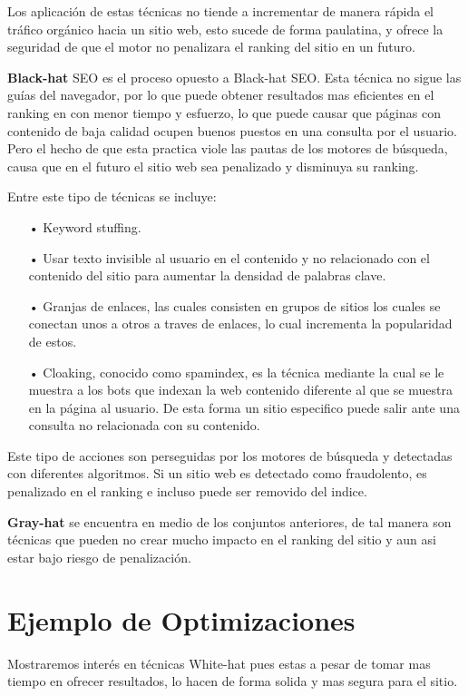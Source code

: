 \documentclass[12pt]{llncs}
\begin{document}
Los aplicación de estas técnicas no tiende a incrementar de manera rápida el tráfico orgánico hacia un sitio web, esto sucede de forma paulatina, y ofrece la seguridad de que el motor no penalizara el ranking del sitio en un futuro.

\textbf{Black-hat} SEO es el proceso opuesto a Black-hat SEO. Esta técnica no sigue las guías del navegador, por lo que puede obtener resultados mas eficientes en el ranking en con menor tiempo y esfuerzo, lo que puede causar que páginas con contenido de baja calidad ocupen buenos puestos en una consulta por el usuario. Pero el hecho de que esta practica viole las pautas de los motores de búsqueda, causa que en el futuro el sitio web sea penalizado y disminuya su ranking.

Entre este tipo de técnicas se incluye:

\begin{itemize}
    \item[•] Keyword stuffing.
    \item[•] Usar texto invisible al usuario en el contenido y no relacionado con el contenido del sitio para aumentar la densidad de palabras clave.
    \item[•] Granjas de enlaces, las cuales consisten en grupos de sitios los cuales se conectan unos a otros a traves de enlaces, lo cual incrementa la popularidad de estos.
    \item[•] Cloaking, conocido como spamindex, es la técnica mediante la cual se le muestra a los bots que indexan la web contenido diferente al que se muestra en la página al usuario. De esta forma un sitio especifico puede salir ante una consulta no relacionada con su contenido.
\end{itemize}

Este tipo de acciones son perseguidas por los motores de búsqueda y detectadas con diferentes algoritmos. Si un sitio web es detectado como fraudolento, es penalizado en el ranking e incluso puede ser removido del indice.

\textbf{Gray-hat} se encuentra en medio de los conjuntos anteriores, de tal manera son técnicas que pueden no crear mucho impacto en el ranking del sitio y aun asi estar bajo riesgo de penalización.

\section{Ejemplo de Optimizaciones}
Mostraremos interés en técnicas White-hat pues estas a pesar de tomar mas tiempo en ofrecer resultados, lo hacen de forma solida y mas segura para el sitio.
\end{document}
